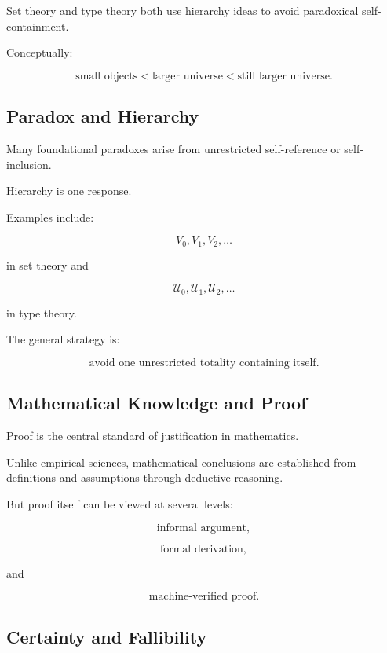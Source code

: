 Set theory and type theory both use hierarchy ideas to avoid paradoxical
self-containment.

Conceptually:

\[
\boxed{
\text{small objects}
<
\text{larger universe}
<
\text{still larger universe}.
}
\]

\subsection{Paradox and Hierarchy}
\label{subsec:paradox-and-hierarchy}

Many foundational paradoxes arise from unrestricted self-reference or
self-inclusion.

Hierarchy is one response.

Examples include:

\[
\boxed{
V_0,V_1,V_2,\ldots
}
\]

in set theory and

\[
\boxed{
\mathcal{U}_0,\mathcal{U}_1,\mathcal{U}_2,\ldots
}
\]

in type theory.

The general strategy is:

\[
\boxed{
\text{avoid one unrestricted totality containing itself}.
}
\]

\subsection{Mathematical Knowledge and Proof}
\label{subsec:mathematical-knowledge-proof}

Proof is the central standard of justification in mathematics.

Unlike empirical sciences, mathematical conclusions are established from
definitions and assumptions through deductive reasoning.

But proof itself can be viewed at several levels:

\[
\boxed{
\text{informal argument},
}
\]

\[
\boxed{
\text{formal derivation},
}
\]

and

\[
\boxed{
\text{machine-verified proof}.
}
\]

\subsection{Certainty and Fallibility}
\label{subsec:mathematical-certainty-fallibility}

